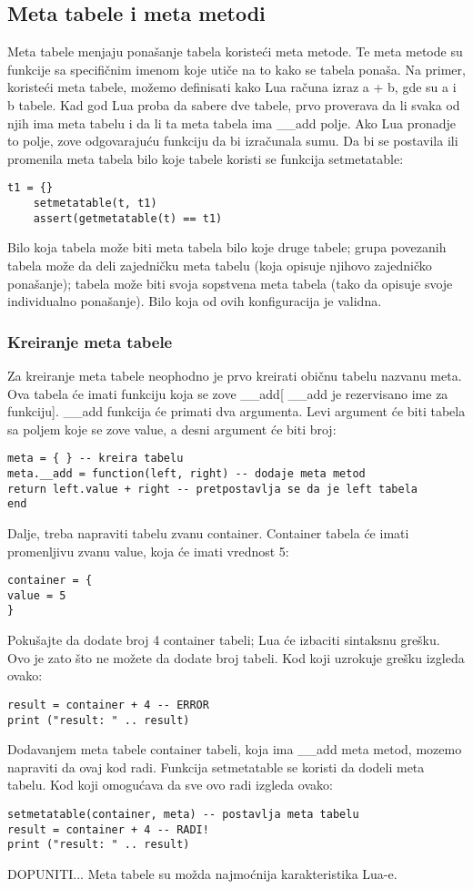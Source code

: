 \documentclass[a4paper]{article}
\begin{document}
\subsection{Meta tabele i meta metodi}
Meta tabele menjaju ponašanje tabela koristeći meta metode. Te meta metode su funkcije sa specifičnim imenom koje utiče na to kako se tabela ponaša. Na primer, koristeći meta tabele, možemo definisati kako Lua računa izraz a + b, gde su a i b tabele. Kad god Lua proba da sabere dve tabele, prvo proverava da li svaka od njih ima meta tabelu i da li ta meta tabela ima \_\_add polje. Ako Lua pronadje to polje, zove odgovarajuću funkciju da bi izračunala sumu.
Da bi se postavila ili promenila meta tabela bilo koje tabele koristi se funkcija setmetatable:
\begin{verbatim}
t1 = {}
    setmetatable(t, t1)
    assert(getmetatable(t) == t1)
\end{verbatim}
Bilo koja tabela može biti meta tabela bilo koje druge tabele; grupa povezanih tabela može da deli zajedničku meta tabelu (koja opisuje njihovo zajedničko ponašanje); tabela može biti svoja sopstvena meta tabela (tako da opisuje svoje individualno ponašanje). Bilo koja od ovih konfiguracija je validna.

\subsubsection{Kreiranje meta tabele}
Za kreiranje meta tabele neophodno je prvo kreirati običnu tabelu nazvanu meta. Ova tabela će imati funkciju koja se zove \_\_add[ \_\_add je rezervisano ime za funkciju]. \_\_add funkcija će primati dva argumenta. Levi argument će biti tabela sa poljem koje se zove value, a desni argument će biti broj:
\begin{verbatim}
meta = { } -- kreira tabelu
meta.__add = function(left, right) -- dodaje meta metod
return left.value + right -- pretpostavlja se da je left tabela
end
\end{verbatim}
Dalje, treba napraviti tabelu zvanu container. Container tabela će imati promenljivu zvanu value, koja će imati vrednost 5:
\begin{verbatim}
container = {
value = 5
}
\end{verbatim}
Pokušajte da dodate broj 4 container tabeli; Lua će izbaciti sintaksnu grešku. Ovo je zato što ne možete da dodate broj tabeli. Kod koji uzrokuje grešku izgleda ovako:
\begin{verbatim}
result = container + 4 -- ERROR
print ("result: " .. result)
\end{verbatim}
Dodavanjem meta tabele container tabeli, koja ima \_\_add meta metod, mozemo napraviti da ovaj kod radi. Funkcija setmetatable se koristi da dodeli meta tabelu. Kod koji omogućava da sve ovo radi izgleda ovako:
\begin{verbatim}
setmetatable(container, meta) -- postavlja meta tabelu
result = container + 4 -- RADI!
print ("result: " .. result)
\end{verbatim}
DOPUNITI... Meta tabele su možda najmoćnija karakteristika Lua-e.
\end{document}
